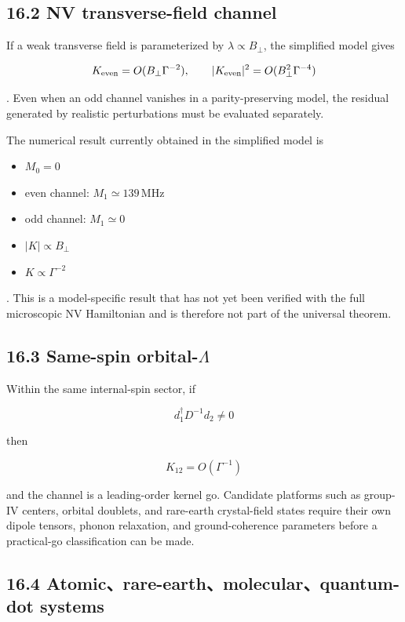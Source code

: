 \documentclass[
  10pt,
  a4paper,
]{article}
\providecommand{\tightlist}{%
  \setlength{\itemsep}{0pt}\setlength{\parskip}{0pt}}
\begin{document}
\subsection{16.2 NV transverse-field
channel}\label{nv-transverse-field-channel}

If a weak transverse field is parameterized by
\(\lambda\propto B_\perp\), the simplified model gives

\[
K_{\rm even}=O(B_\perp\Gamma^{-2}),
\qquad
|K_{\rm even}|^2=O(B_\perp^2\Gamma^{-4})
\]

. Even when an odd channel vanishes in a parity-preserving model, the
residual generated by realistic perturbations must be evaluated
separately.

The numerical result currently obtained in the simplified model is

\begin{itemize}
\tightlist
\item
  \(M_0=0\)
\item
  even channel: \(M_1\simeq139\,\mathrm{MHz}\)
\item
  odd channel: \(M_1\simeq0\)
\item
  \(|K|\propto B_\perp\)
\item
  \(K\propto\Gamma^{-2}\)
\end{itemize}

. This is a model-specific result that has not yet been verified with
the full microscopic NV Hamiltonian and is therefore not part of the
universal theorem.

\subsection{\texorpdfstring{16.3 Same-spin
orbital-\(\Lambda\)}{16.3 Same-spin orbital-\textbackslash Lambda}}\label{same-spin-orbital-lambda}

Within the same internal-spin sector, if

\[
d_1^\dagger D^{-1}d_2\neq0
\]

then

\[
K_{12}=O(\Gamma^{-1})
\]

and the channel is a leading-order kernel go. Candidate platforms such
as group-IV centers, orbital doublets, and rare-earth crystal-field
states require their own dipole tensors, phonon relaxation, and
ground-coherence parameters before a practical-go classification can be
made.

\subsection{16.4 Atomic、rare-earth、molecular、quantum-dot
systems}\label{atomicrare-earthmolecularquantum-dot-systems}
\end{document}
